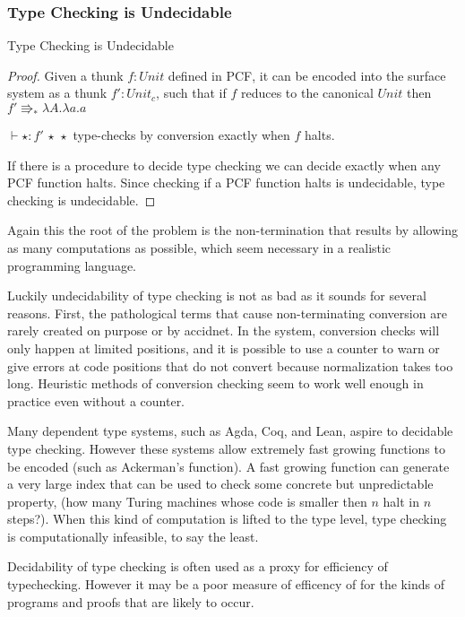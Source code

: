 \subsubsection{Type Checking is Undecidable}
\begin{thm}
Type Checking is Undecidable
\end{thm}

\begin{proof}
Given a thunk $f:Unit$ defined in PCF, it can be encoded into the surface system as a thunk $f':Unit_{c}$, such that if $f$ reduces to the canonical $Unit$ then $f'\Rrightarrow_{\ast}\lambda A.\lambda a.a$ 

$\vdash\star:f'\,\star\,\star$ type-checks by conversion exactly when $f$ halts.

If there is a procedure to decide type checking we can decide exactly when any PCF function halts.
Since checking if a PCF function halts is undecidable, type checking is undecidable.

\end{proof}

Again this the root of the problem is the non-termination that results by allowing as many computations as possible, which seem necessary in a realistic programming language.

Luckily undecidability of type checking is not as bad as it sounds for several reasons.
First, the pathological terms that cause non-terminating conversion are rarely created on purpose or by accidnet.
In the \bidir{} system, conversion checks will only happen at limited positions, and it is possible to use a counter to warn or give errors at code positions that do not convert because normalization takes too long.
Heuristic methods of conversion checking seem to work well enough in practice even without a counter.

Many dependent type systems, such as Agda, Coq, and Lean, aspire to decidable type checking.
However these systems allow extremely fast growing functions to be encoded (such as Ackerman's function).
A fast growing function can generate a very large index that can be used to check some concrete but unpredictable property, (how many Turing machines whose code is smaller then $n$ halt in $n$ steps?).
When this kind of computation is lifted to the type level, type checking is computationally infeasible, to say the least.

Decidability of type checking is often used as a proxy for efficiency of typechecking.
However it may be a poor measure of efficency of for the kinds of programs and proofs that are likely to occur.

